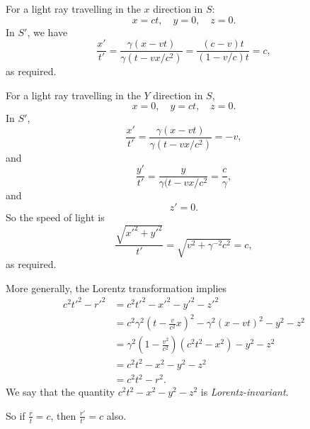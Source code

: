 \documentclass[a4paper]{article}
\begin{document}
For a light ray travelling in the $x$ direction in $S$:
\[
  x = ct,\quad y = 0,\quad z = 0.
\]
In $S'$, we have
\[
  \frac{x'}{t'} = \frac{\gamma(x - vt)}{\gamma(t - vx/c^2)} = \frac{(c - v)t}{(1 - v/c)t} = c,
\]
as required.

For a light ray travelling in the $Y$ direction in $S$,
\[
  x = 0,\quad y = ct,\quad z = 0.
\]
In $S'$,
\[
  \frac{x'}{t'} = \frac{\gamma(x - vt)}{\gamma(t - vx/c^2)} = -v,
\]
and
\[
  \frac{y'}{t'} = \frac{y}{\gamma(t - vx/c^2} = \frac{c}{\gamma},
\]
and
\[
  z' = 0.
\]
So the speed of light is
\[
  \frac{\sqrt{x'^2 + y'^2}}{t'} = \sqrt{v^2 + \gamma^{-2}c^2} = c,
\]
as required.

More generally, the Lorentz transformation implies
\begin{align*}
  c^2t'^2 - r'^2 &= c^2t'^2 - x'^2 - y'^2 - z'^2\\
  &= c^2 \gamma^2\left(t - \frac{v}{c^2}x\right)^2 - \gamma^2(x - vt)^2 - y^2 - z^2\\
  &= \gamma^2\left(1 - \frac{v^2}{c^2}\right)(c^2t^2 - x^2) - y^2 - z^2\\
  &= c^2t^2 - x^2 - y^2 - z^2\\
  &= c^2t^2 - r^2.
\end{align*}
We say that the quantity $c^2t^2 - x^2 - y^2 - z^2$ is \emph{Lorentz-invariant}.

So if $\frac{r}{t} = c$, then $\frac{r'}{t'} = c$ also.
\end{document}
